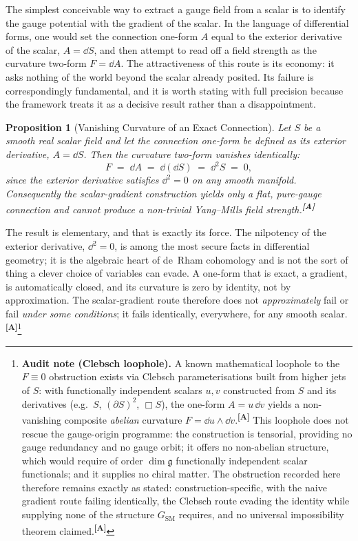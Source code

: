 \documentclass[12pt,a4paper,twoside]{article}
\theoremstyle{plain}
\newtheorem{proposition}[theorem]{Proposition}
\theoremstyle{definition}
\theoremstyle{remark}
\newcommand{\catmark}[1]{\textsuperscript{\textsf{\textbf{[#1]}}}}
\begin{document}
The simplest conceivable way to extract a gauge field from a scalar is to identify the gauge potential with the gradient of the scalar. In the language of differential forms, one would set the connection one-form $A$ equal to the exterior derivative of the scalar, $A = \dd S$, and then attempt to read off a field strength as the curvature two-form $F = \dd A$. The attractiveness of this route is its economy: it asks nothing of the world beyond the scalar already posited. Its failure is correspondingly fundamental, and it is worth stating with full precision because the framework treats it as a decisive result rather than a disappointment.

\begin{proposition}[Vanishing Curvature of an Exact Connection]
\label{prop:d2-obstruction}
Let $S$ be a smooth real scalar field and let the connection one-form be defined as its exterior derivative, $A = \dd S$. Then the curvature two-form vanishes identically:
\[
 F \;=\; \dd A \;=\; \dd(\dd S) \;=\; \dd^2 S \;=\; 0,
\]
since the exterior derivative satisfies $\dd^2 = 0$ on any smooth manifold. Consequently the scalar-gradient construction yields only a flat, pure-gauge connection and cannot produce a non-trivial Yang--Mills field strength.\catmark{A}
\end{proposition}

\noindent The result is elementary, and that is exactly its force. The nilpotency of the exterior derivative, $\dd^2 = 0$, is among the most secure facts in differential geometry; it is the algebraic heart of de~Rham cohomology and is not the sort of thing a clever choice of variables can evade. A one-form that is exact, a gradient, is automatically closed, and its curvature is zero by identity, not by approximation. The scalar-gradient route therefore does not \emph{approximately} fail or fail \emph{under some conditions}; it fails identically, everywhere, for any smooth scalar.\catmark{A}\footnote{\textbf{Audit note (Clebsch loophole).} A known mathematical loophole to the $F \equiv 0$ obstruction exists via Clebsch parameterisations built from higher jets of $S$: with functionally independent scalars $u,v$ constructed from $S$ and its derivatives (e.g.\ $S$, $(\partial S)^2$, $\Box S$), the one-form $A = u\,\dd v$ yields a non-vanishing composite \emph{abelian} curvature $F = \dd u \wedge \dd v$.\catmark{A} This loophole does not rescue the gauge-origin programme: the construction is tensorial, providing no gauge redundancy and no gauge orbit; it offers no non-abelian structure, which would require of order $\dim\mathfrak{g}$ functionally independent scalar functionals; and it supplies no chiral matter. The obstruction recorded here therefore remains exactly as stated: construction-specific, with the naive gradient route failing identically, the Clebsch route evading the identity while supplying none of the structure $G_{\mathrm{SM}}$ requires, and no universal impossibility theorem claimed.\catmark{A}}
\end{document}
